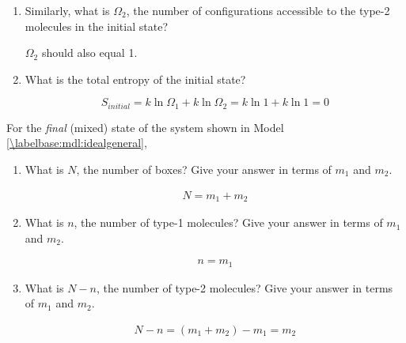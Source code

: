 \begin{activity}
\begin{ctqs}
\begin{enumerate}
				\item Similarly, what is $\Omega_2$, the number of configurations accessible to the type-2 molecules in the initial state?
				
					\begin{solution}[0.75in]
						$\Omega_2$ should also equal 1.
					\end{solution}
					
				\item What is the total entropy of the initial state?
					
					\begin{solution}[1in]
						\begin{equation*}
						S_{initial} = k \ln \Omega_1 + k \ln \Omega_2 = k \ln 1 + k \ln 1 = 0
						\end{equation*}
					\end{solution}
			\end{enumerate}
		
		\question For the \emph{final} (mixed) state of the system shown in Model \ref{\labelbase:mdl:idealgeneral},
		
			\begin{enumerate}
				\item What is $N$, the number of boxes?  Give your answer in terms of $m_1$ and $m_2$.
				
					\begin{solution}[0.5in]
						\begin{align*}
							N = m_1 + m_2
						\end{align*}
					\end{solution}
				
				\item What is $n$, the number of type-1 molecules?  Give your answer in terms of $m_1$ and $m_2$.
				
					\begin{solution}[0.5in]
						\begin{align*}
							n = m_1
						\end{align*}
					\end{solution}
				
				\item What is $N-n$, the number of type-2 molecules?  Give your answer in terms of $m_1$ and $m_2$.
				
					\begin{solution}[0.5in]
						\begin{align*}
							N-n = (m_1+m_2) - m_1 = m_2
						\end{align*}
					\end{solution}
					

\end{enumerate}
\end{ctqs}
\end{activity}
